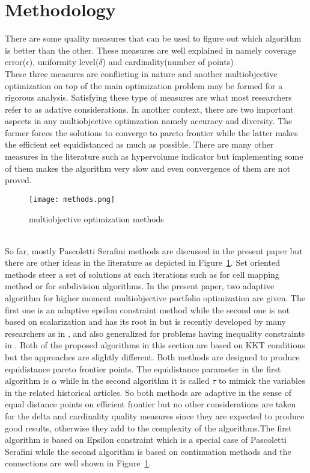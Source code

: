 \documentclass[12pt,a4paper]{article}
\numberwithin{equation}{section}
\begin{document}
\section{Methodology}
There are some quality measures that can be used to figure out which algorithm is better than the other. These measures are well explained in \citep{Eichfelder2008} namely coverage error($\epsilon$), uniformity level($\delta$) and cardinality(number of points) \\
These three measures are conflicting in nature and another multiobjective optimization on top of the main optimization problem may be formed for a rigorous analysis. Satisfying these type of measures are what most researchers refer to as adative considerations. In another context, there are two important aspects in any multiobjective optimzation namely accuracy and diversity. The former forces the solutions to converge to pareto frontier while the latter makes the efficient set equidistanced as much as possible. There are many other measures in the literature such as hypervolume indicator but implementing some of them makes the algorithm very slow and even convergence of them are not proved.
\begin{figure}
  \texttt{[image: methods.png]}
  \caption{multiobjective optimization methods}
  \label{fig:methods}
\end{figure} 
\\
So far, mostly Pascoletti Serafini methods are discussed in the present paper but there are other ideas in the literature as depicted in Figure~\ref{fig:methods}. Set oriented methods steer a set of solutions at each iterations such as \citep{Hernandez2013} for cell mapping method or \citep{Dellnitz2005} for subdivision algorithms.
In the present paper, two adaptive algorithm for higher moment multiobjective portfolio optimization are given. The first one is an adaptive epsilon constraint method while the second one is not based on scalarization and has its root in \citep{Hillermeier2001} but is recently developed by many researchers as in \citep{Martin2018} , \citep{Schutze2020} and also generalized for problems having inequality constraints in \citep{Beltran2020}. 
Both of the proposed algorithms in this section are based on KKT conditions but the approaches are slightly different. Both methods are designed to produce equidistance pareto frontier points. The equidistance parameter in the first algorithm is $\alpha$ while in the second algorithm it is called $\tau$ to mimick the variables in the related historical articles. So both methods are adaptive in the sense of equal distance points on efficient frontier but no other considerations are taken for the delta and cardinality quality measures since they are expected to produce good results, otherwise they add to the complexity of the algorithms.The first algorithm is based on Epsilon constraint which is a special case of Pascoletti Serafini while the second algorithm is based on continuation methods and the connections are well shown in Figure~\ref{fig:methods}.
\end{document}
